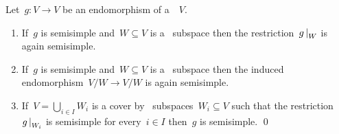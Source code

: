 \begin{lemma}
  \label{properties of ss endomorphisms}
  Let~$g \colon V \to V$ be an endomorphism of a~{\kvs}~$V$.
  \begin{enumerate}
    \item
      \label{restrictions again semisimple}
      If~$g$ is semisimple and~$W \subseteq V$ is a~ subspace then the restriction~$\restrict{g}{W}$ is again semisimple.
    \item
      If~$g$ is semisimple and~$W \subseteq V$ is a~ subspace then the induced endomorphism~$V/W \to V/W$ is again semisimple.
    \item
      \label{semisimple via sum covering}
        If~$V = \bigcup_{i \in I} W_i$ is a cover by~ subspaces~$W_i \subseteq V$ such that the restriction~$\restrict{g}{W_i}$ is semisimple for every~$i \in I$ then~$g$ is semisimple.
    \qed
  \end{enumerate}
\end{lemma}




